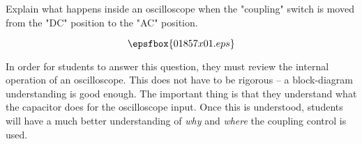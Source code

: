 

Explain what happens inside an oscilloscope when the "coupling" switch is moved from the "DC" position to the "AC" position.







$$\epsfbox{01857x01.eps}$$







In order for students to answer this question, they must review the internal operation of an oscilloscope.  This does not have to be rigorous -- a block-diagram understanding is good enough.  The important thing is that they understand what the capacitor does for the oscilloscope input.  Once this is understood, students will have a much better understanding of {\it why} and {\it where} the coupling control is used.




